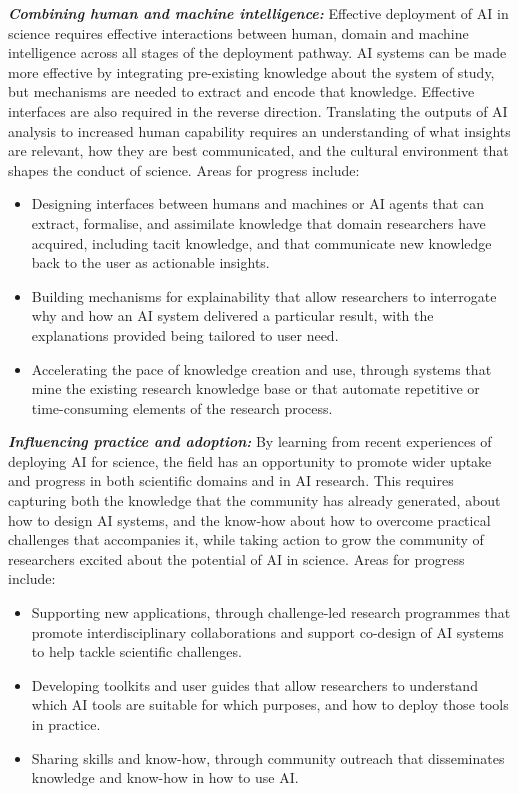 \emph{\textbf{Combining human and machine intelligence:}} Effective
deployment of AI in science requires effective interactions between
human, domain and machine intelligence across all stages of the
deployment pathway. AI systems can be made more effective by integrating
pre-existing knowledge about the system of study, but mechanisms are
needed to extract and encode that knowledge. Effective interfaces are
also required in the reverse direction. Translating the outputs of AI
analysis to increased human capability requires an understanding of what
insights are relevant, how they are best communicated, and the cultural
environment that shapes the conduct of science. Areas for progress
include:

\begin{itemize}
\item
  Designing interfaces between humans and machines or AI agents that can
  extract, formalise, and assimilate knowledge that domain researchers
  have acquired, including tacit knowledge, and that communicate new
  knowledge back to the user as actionable insights.
\item
  Building mechanisms for explainability that allow researchers to
  interrogate why and how an AI system delivered a particular result,
  with the explanations provided being tailored to user need.
\item
  Accelerating the pace of knowledge creation and use, through systems
  that mine the existing research knowledge base or that automate
  repetitive or time-consuming elements of the research process.
\end{itemize}

\emph{\textbf{Influencing practice and adoption:}} By learning from
recent experiences of deploying AI for science, the field has an
opportunity to promote wider uptake and progress in both scientific
domains and in AI research. This requires capturing both the knowledge
that the community has already generated, about how to design AI
systems, and the know-how about how to overcome practical challenges
that accompanies it, while taking action to grow the community of
researchers excited about the potential of AI in science. Areas for
progress include:

\begin{itemize}
\item
  Supporting new applications, through challenge-led research programmes
  that promote interdisciplinary collaborations and support co-design of
  AI systems to help tackle scientific challenges.
\item
  Developing toolkits and user guides that allow researchers to
  understand which AI tools are suitable for which purposes, and how to
  deploy those tools in practice.
\item
  Sharing skills and know-how, through community outreach that
  disseminates knowledge and know-how in how to use AI.
\end{itemize}

